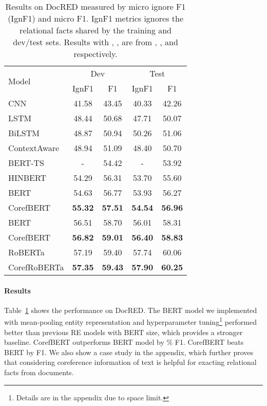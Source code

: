 \documentclass[11pt,a4paper]{article}
\newcommand\BASESIZE{\xspace}
\newcommand\LARGESIZE{\xspace}
\begin{document}
\begin{table}[!t]
\small
\centering
\begin{tabular}{l c c c c}
\toprule

\multirow{2}{*}{Model}   &\multicolumn{2}{c}{Dev}   &  \multicolumn{2}{c}{Test}  \\
                        &  IgnF1        & F1            & IgnF1        & F1 \\
\midrule
CNN & 41.58 &  43.45 &  40.33 &  42.26 \\
LSTM & 48.44 &50.68 & 47.71 & 50.07\\
BiLSTM & {48.87}  & 50.94 & 50.26 & 51.06 \\
ContextAware & 48.94 & 51.09 & 48.40  & 50.70 \\  
\midrule
BERT-TS\BASESIZE   & - & 54.42 & -& 53.92\\
HINBERT\BASESIZE  & 54.29 &56.31 & 53.70 & 55.60 \\
BERT\BASESIZE  &54.63 & 56.77 & 53.93 & 56.27 \\
CorefBERT\BASESIZE & \bf{55.32} & \bf{57.51} & \bf{54.54} & \bf{56.96} \\
\midrule
BERT\LARGESIZE  & 56.51 & 58.70 & 56.01 & 58.31 \\
CorefBERT\LARGESIZE & \bf{56.82} & \bf{59.01} & \bf{56.40} & \bf{58.83} \\
\midrule
RoBERTa\LARGESIZE & 57.19 & {59.40} & 57.74 & 60.06\\
CorefRoBERTa\LARGESIZE & \bf{57.35} & \bf{59.43} & \bf{57.90} & \bf{60.25} \\
\bottomrule
\end{tabular}
\caption{Results on DocRED measured by micro ignore F1 (IgnF1) and micro F1. IgnF1 metrics ignores the relational facts shared by the training and dev/test sets. Results with , ,  are from \citet{DocRED}, \citet{DocREDBert}, and \citet{HinBERT} respectively.}
\label{tab:DocRED_result}
\end{table}

\vspace{-0.1em}
\paragraph{Results} Table~\ref{tab:DocRED_result} shows the performance on DocRED. The BERT\BASESIZE model we implemented with mean-pooling entity representation and hyperparameter tuning\footnote{Details are in the appendix due to space limit.}  performed better than previous RE models with BERT\BASESIZE size, which provides a stronger baseline. CorefBERT\BASESIZE outperforms BERT\BASESIZE model by \% F1. CorefBERT\LARGESIZE beats BERT\LARGESIZE by  F1. 
We also show a case study in the appendix, which further proves that considering coreference information of text is helpful for exacting relational facts from documents.
\end{document}
